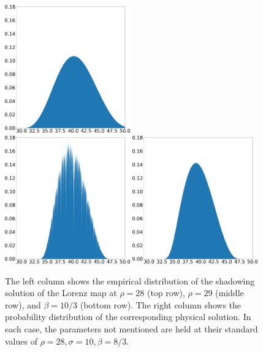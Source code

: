 \begin{figure}
    \hspace{0.005\textwidth}
    \includegraphics[width=0.48\textwidth]{baseline_density_lorenz_zmax_10_30_2.67.json.png}
    \\
    \includegraphics[width=0.48\textwidth]{lorenz_shadow_density_lorenz_zmax_10_28_3.33.json.png}
    \hspace{0.005\textwidth}
    \includegraphics[width=0.48\textwidth]{baseline_density_lorenz_zmax_10_28_3.33.json.png}
    \caption{The left column shows the empirical distribution of the shadowing solution of the Lorenz map at $\rho = 28$ (top row), $\rho = 29$ (middle row), and $\beta = 10/3$ (bottom row). The right column shows the probability distribution of the corresponding physical solution. In each case, the parameters not mentioned are held at their standard values of $\rho = 28, \sigma = 10, \beta = 8/3.$
    }
    \label{fig:lorenz_params_scaled}
\end{figure}
